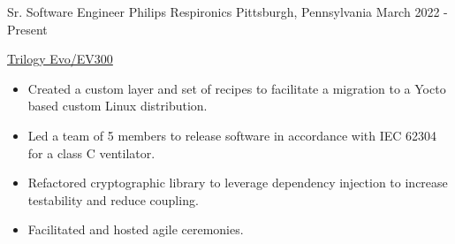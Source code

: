 

\begin{cventries}

\cventry
  {Sr. Software Engineer} %
  {Philips Respironics} %
  {Pittsburgh, Pennsylvania} %
  {March 2022 - Present} %
  {
    \begin{cvitems}
    \item
    {
      \href{https://www.usa.philips.com/healthcare/product/HC0055500/trilogy-evo-portable-hospital-to-home-ventilator}{\color{RoyalBlue}Trilogy Evo/EV300}
      \begin{itemize}
        \item Created a custom layer and set of recipes to facilitate a migration to a Yocto based custom Linux distribution.
        \item Led a team of 5 members to release software in accordance with IEC 62304 for a class C ventilator.
        \item Refactored cryptographic library to leverage dependency injection to increase testability and reduce coupling.
        \item Facilitated and hosted agile ceremonies.
      \end{itemize}
    }
    \end{cvitems}
  }


\end{cventries}
